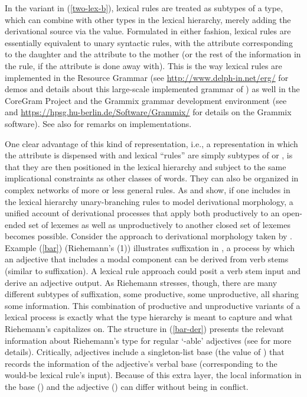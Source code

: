 \documentclass[output=paper
 	        ,biblatex
                ,babelshorthands
                ,newtxmath
                ,draftmode
                ,colorlinks, citecolor=brown
]{langscibook}
\begin{document}
In the variant in (\ref{two-lex-b}), lexical rules are treated as subtypes of a  type, which can combine with other types in the lexical hierarchy, merely adding the derivational source via the  value. 
Formulated in either fashion, lexical rules are essentially equivalent to unary syntactic rules, with the  attribute corresponding to the daughter and the  attribute to the mother (or the rest of the information in the rule, if the  attribute is done away with). This is the way lexical rules are implemented in the  Resource Grammar (see \url{http://www.delph-in.net/erg/} for demos and details about this large-scale implemented grammar of ) as well in the CoreGram Project and the Grammix grammar development environment  (see \citealt{MuellerGrammix} and \url{https://hpsg.hu-berlin.de/Software/Grammix/} for details on the Grammix software). See also  for remarks on implementations.

One clear advantage of this kind of representation, i.e., a representation in which the attribute  is dispensed with and lexical ``rules'' are simply subtypes of  or , is that they are then positioned in the lexical hierarchy and subject to the same implicational constraints as other classes of words. 
They can also be organized in complex networks of more or less general rules. 
As \citet{Riehemann1998} and \citet{Koenig1999c} show, if one includes in the lexical hierarchy unary-branching rules to model derivational morphology, a unified account of derivational processes that apply both productively to an open-ended set of lexemes as well as unproductively to another closed set of lexemes becomes possible. 
Consider the approach to derivational morphology taken by \citet{Riehemann1998}.
Example (\ref{bar}) (Riehemann's (1)) illustrates  suffixation in , a process by which an adjective that includes a modal component can be derived from verb stems (similar to   suffixation). 
A lexical rule approach could posit a verb stem input and derive an adjective output. 
As Riehemann stresses, though, there are many different subtypes of  suffixation, some productive, some unproductive, all sharing some information. 
This combination of productive and unproductive variants of a lexical process is exactly what the type hierarchy is meant to capture and what Riehemann's  capitalizes on. 
The structure in (\ref{bar-der}) presents the relevant information about Riehemann's type for regular  `-able' adjectives (see \citealt[68]{Riehemann1998} for more details). 
Critically,  adjectives include a singleton-list base (the value of ) that records the information of the adjective's verbal base (corresponding to the would-be lexical rule's input). 
Because of this extra layer, the local information in the base () and the  adjective () can differ without being in conflict.
\end{document}

